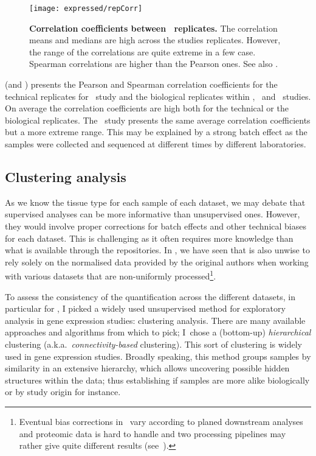 \begin{figure}[!htpb]
    \texttt{[image: expressed/repCorr]}\centering
    \caption[Correlation coefficients between RNA-Seq replicates]{%
    \label{fig:repCorr}\textbf{Correlation coefficients between \Rnaseq\
    replicates.}
    The correlation means and medians are high across the studies replicates.
    However, the range of the correlations are quite extreme in a few
    case. Spearman correlations are higher than the Pearson ones.
    See also \Cref{subsec:PearsonVsSpearman}.}
\end{figure}

 (and ) presents
the Pearson and Spearman correlation coefficients
for the technical replicates for \uhlen\ study and
the biological replicates within \vt, \gtex\ and \uhlen\ studies.
On average the correlation coefficients are high both for the technical or
the biological replicates.
The \gtex\ study presents the same average correlation coefficients
but a more extreme range.
This may be explained by a strong batch effect as the samples were collected
and sequenced at different times by different laboratories.\mybr\

\subsection{Clustering analysis}\label{subsec:clusteringPres}

As we know the tissue type for each sample of each dataset,
we may debate that supervised analyses can be more informative
than unsupervised ones.
However, they would involve proper corrections for batch effects and
other technical biases for each dataset.
This is challenging as it often requires more knowledge than what is available
through the repositories.
In , we have seen that is also unwise to rely solely on the
normalised data provided by the original authors
when working with various datasets
that are non-uniformly processed\footnote{Eventual bias
corrections in \Rnaseq\ vary according to planed downstream analyses and
proteomic data is hard to handle and two processing pipelines may rather give
quite different results (see~\Cref{sec:NewQuantProt}).}.\mybr\

To assess the consistency of the quantification across the different datasets,
in particular for \Rnaseq,
I picked a widely used unsupervised method
for exploratory analysis in gene expression studies:
clustering analysis.
There are many available approaches and algorithms from which to pick;
I~chose a (bottom-up) \emph{hierarchical} clustering (a.k.a.\
\emph{connectivity-based} clustering).
This sort of clustering is widely used in gene expression studies.
Broadly speaking,
this method groups samples by similarity in an extensive hierarchy,
which allows uncovering possible hidden structures within the data;
thus establishing if samples are more alike biologically or by study origin
for instance.\mybr\

